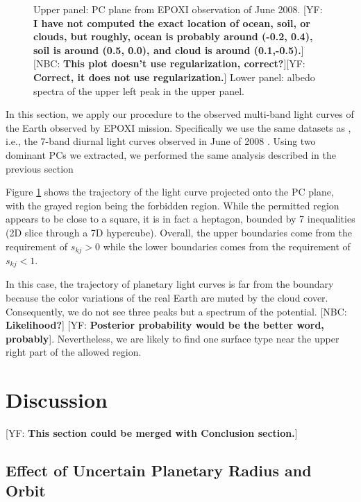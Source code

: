 \documentclass[iop,numberedappendix,apj,]{emulateapj}
\def\memoYF#1{\color{red}[YF: {\bf #1}]\color{black}}
\def\memoNBC#1{\color{blue}[NBC: {\bf #1}]\color{black}}
\begin{document}
\begin{figure}[tbh!]
\begin{center}
    \end{center}
    \caption{Upper panel: PC plane from EPOXI observation of June 2008. \memoYF{I have not computed the exact location of ocean, soil, or clouds, but roughly, ocean is probably around (-0.2, 0.4), soil is around (0.5, 0.0), and cloud is around (0.1,-0.5).} \memoNBC{This plot doesn't use regularization, correct?}\memoYF{Correct, it does not use regularization.} Lower panel: albedo spectra of the upper left peak in the upper panel. }
\label{fig:EPOXI}
\end{figure}

In this section, we apply our procedure to the observed multi-band light curves of the Earth observed by EPOXI mission. 
Specifically we use the same datasets as \citet{Cowan2013}, i.e., the 7-band diurnal light curves observed in June of 2008 \citep{Livengood2011}. 
Using two dominant PCs we extracted, we performed the same analysis described in the previous section 

Figure \ref{fig:EPOXI} shows the trajectory of the light curve projected onto the PC plane, with the grayed region being the forbidden region. 
While the permitted region appears to be close to a square, it is in fact a heptagon, bounded by 7 inequalities (2D slice through a 7D hypercube). 
Overall, the upper boundaries come from the requirement of $s_{kj}>0$ while the lower boundaries comes from the requirement of $s_{kj}<1$. 

In this case, the trajectory of planetary light curves is far from the boundary because the color variations of the real Earth are muted by the cloud cover. 
Consequently, we do not see three peaks but a spectrum of the potential. \memoNBC{Likelihood?} \memoYF{Posterior probability would be the better word, probably}. 
Nevertheless, we are likely to find one surface type near the upper right part of the allowed region. 




\section{Discussion}
\label{s:discussion}

\memoYF{This section could be merged with Conclusion section.}

\subsection{Effect of Uncertain Planetary Radius and Orbit}
\end{document}
